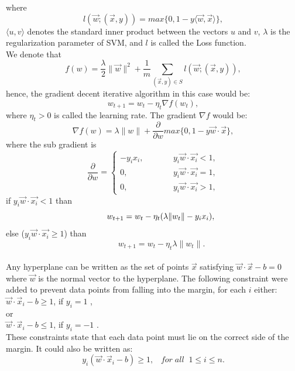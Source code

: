 \documentclass[12pt]{article}
\begin{document}
where 
\begin{equation}
    l(\vec{w};(\vec{x},y))=max\{0,1-y\langle \vec{w},\vec{x} \rangle \},
\end{equation}
$\langle u,v \rangle$ denotes the standard inner product between the vectors $u$ and $v$, $\lambda$ is the regularization parameter of SVM, and $l$ is called the Loss function.\\
We denote that 
$$ f(w) = \frac{\lambda}{2}\|\vec{w}\|^2 + \frac{1}{m} \sum_{(\vec{x},y) \in S} l(\vec{w};(\vec{x},y)),$$
hence, the gradient decent iterative algorithm in this case would be:\\
$$w_{t+1} = w_t - \eta_t \nabla f(w_t), $$
where $\eta_t>0$ is called the learning rate. 
The gradient $\nabla f$ would be:
$$\nabla f(w) = \lambda \|w\| + \frac{\partial}{\partial w} max \{ 0,1-y \vec{w} \cdot\vec{x} \} ,$$
where the sub gradient is 
\begin{equation}
    \frac{\partial}{\partial w}= \left\{
  \begin{aligned}
    - y_i x_i, &\qquad& y_i \vec{w} \cdot\vec{x_i} <1, \\
    0, &\qquad& y_i \vec{w} \cdot\vec{x_i} =1, \\
    0, &\qquad& y_i \vec{w} \cdot\vec{x_i} >1, 
  \end{aligned}
  \right.
\end{equation}
if $y_i \vec{w} \cdot\vec{x_i} <1 $ than\\
\begin{equation}\label{grad}
    \qquad w_{t+1} = w_t - \eta_t (\lambda \|w_t\|  - y_i x_i  ),\\
\end{equation}
else ($y_i \vec{w} \cdot\vec{x_i} \geq1 $) than
\begin{equation}\label{grad2}
    \qquad w_{t+1} = w_t - \eta_t \lambda \|w_t\|.
\end{equation}
\\Any hyperplane can be written as the set of points $\vec{x} $ satisfying $\vec{w}\cdot \vec{x}-b=0$ where $\vec{w}$ is the normal vector to the hyperplane. The following constraint were added to prevent data points from falling into the margin, for each $i$ either:\\
\indent $\vec{w} \cdot \vec{x}_i -b \geq 1$, if $ y_i=1 $ ,\\
or\\
\indent $\vec{w} \cdot \vec{x}_i -b \leq 1$, if $ y_i=-1 $ .\\
These constraints state that each data point must lie on the correct side of the margin. It could also be written as:
\begin{equation}
    y_i (\vec{w} \cdot \vec{x}_i -b) \geq 1, \;\;\; for \; all \;\; 1\leq i \leq n.
\end{equation}
\end{document}
